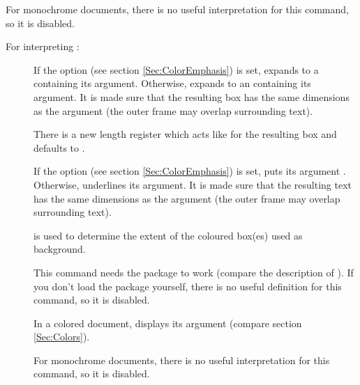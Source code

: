 \begin{slide}
\begin{description}
    For monochrome documents, there is no useful interpretation for this command, so it is disabled.
  \end{description}

  \newslide

  For interpreting :
  \begin{description}
  \item[]
    If the  option (see section \ref{Sec:ColorEmphasis})
    is set, expands to a  containing its argument. Otherwise, expands to an
     containing its argument. It is made sure that the resulting box has the same dimensions as the
    argument (the outer frame may overlap surrounding text).

    There is a new length register 
     which acts like  for the
    resulting box and defaults to .

    \newslide

  \item[{}]
    If the  option (see section \ref{Sec:ColorEmphasis})
    is set, puts its argument . Otherwise, underlines its
    argument. It is made sure that the resulting text has the same dimensions as the argument (the outer frame may
    overlap surrounding text).

     is used to determine the extent of the coloured box(es) used as background.

    This command needs the \href{ftp://ftp.dante.de/tex-archive/help/Catalogue/entries/soul.html}{} package
    to work (compare the description of ). If you don't load the  package yourself, there
    is no useful definition for this command, so it is disabled.

    \newslide

  \item[]
    In a colored document, displays its argument  (compare section \ref{Sec:Colors}).

    For monochrome documents, there is no useful interpretation for this command, so it is disabled.
  \end{description}


\end{slide}
